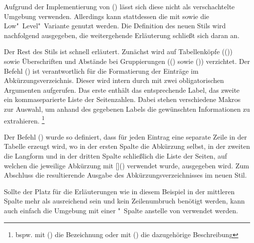 \documentclass[%
  english,ngerman,%
  cdgeometry=no,DIV=12,%
  automark,%
  listof=toc,%
]{tudscrartcl}
\begin{document}
Aufgrund der Implementierung von () 
lässt sich diese nicht als verschachtelte Umgebung verwenden. Allerdings kann 
stattdessen die mit  sowie  die 
Low"~Level"~Variante genutzt werden. Die Definition des neuen Stils 
 wird nachfolgend ausgegeben, die weitergehende 
Erläuterung schließt sich daran an.
%
\CodeHook{\let\newglossarystyle\renewglossarystyle}
\begin{Hint*}

\end{Hint*}
%
Der Rest des Stils ist schnell erläutert. Zunächst wird auf Tabellenköpfe 
(()) sowie Überschriften und Abstände 
bei Gruppierungen (() sowie 
()) verzichtet. Der Befehl 
() ist verantwortlich für die 
Formatierung der Einträge im Abkürzungsverzeichnis. Dieser wird intern durch 
 mit zwei obligatorischen Argumenten aufgerufen. Das erste 
enthält das entsprechende Label, das zweite ein kommaseparierte Liste der 
Seitenzahlen. Dabei stehen verschiedene Makros zur Auswahl, um anhand des 
gegebenen Labels die gewünschten Informationen zu extrahieren.%
\footnote{%
  bspw. mit () die Bezeichnung oder 
  mit () die dazugehörige Beschreibung%
}

Der Befehl () wurde so definiert, dass 
für jeden Eintrag eine separate Zeile in der Tabelle erzeugt wird, wo in der 
ersten Spalte die Abkürzung selbst, in der zweiten die Langform und in der 
dritten Spalte schließlich die Liste der Seiten, auf welchen die jeweilige 
Abkürzung mit []() verwendet 
wurde, ausgegeben wird. Zum Abschluss die resultierende Ausgabe des 
Abkürzungsverzeichnisses im neuen Stil.
%
\begin{Hint}
\printacronyms[style=acrotabularx]
\end{Hint}
\begin{quoting}[rightmargin=0pt]
\InputCode
\end{quoting}
%
Sollte der Platz für die Erläuterungen wie in diesem Beispiel in der mittleren 
Spalte mehr als ausreichend sein und kein Zeilenumbruch benötigt werden, kann 
auch einfach die Umgebung  mit einer "~Spalte 
anstelle von  verwendet werden.
\end{document}
